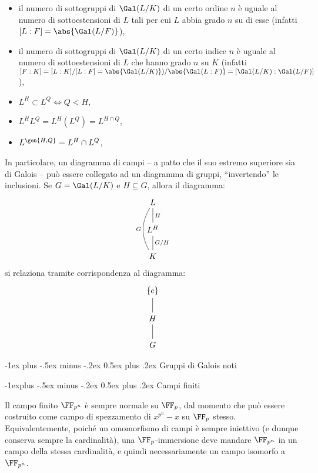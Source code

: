 \documentclass[10pt,landscape]{article}
\makeatletter
\renewcommand{\section}{\@startsection{section}{1}{0mm}%
	{-1ex plus -.5ex minus -.2ex}%
	{0.5ex plus .2ex}%
	{\normalfont\large\bfseries}}
\renewcommand{\subsection}{\@startsection{subsection}{2}{0mm}%
	{-1explus -.5ex minus -.2ex}%
	{0.5ex plus .2ex}%
	{\normalfont\normalsize\bfseries}}
\makeatother
\begin{document}
\begin{multicols}{3}
		\begin{itemize}
			\item il numero di sottogruppi di $\Gal(L / K)$ di un certo ordine $n$ è uguale al numero di sottoestensioni di $L$ tali per cui $L$ abbia
			grado $n$ su di esse (infatti $[L : F] = \abs{\Gal(L / F)}$),
			\item il numero di sottogruppi di $\Gal(L / K)$ di
			un certo indice $n$ è uguale al numero di
			sottoestensioni di $L$ che hanno grado $n$ su
			$K$ (infatti $[F : K] = [L : K] / [L : F] = \abs{\Gal(L / K)}) / \abs{\Gal(L : F)} =
			[\Gal(L / K) : \Gal(L / F)]$),
			\item $L^H \subset L^Q \iff Q < H$,
			\item $L^H L^Q = L^H(L^Q) = L^{H \cap Q}$,
			\item $L^{\gen{H, Q}} = L^H \cap L^Q$,
		\end{itemize}
	
		In particolare, un diagramma di campi -- a patto
		che il suo estremo superiore sia di Galois -- può
		essere collegato ad un diagramma di gruppi,
		``invertendo'' le inclusioni. Se
		$G = \Gal(L / K)$ e $H \subseteq G$, allora il
		diagramma:
		    \[\begin{tikzcd}
				L \\
				{L^H} \\
				K
				\arrow["G", bend left, no head, from=3-1, to=1-1]
				\arrow["{G/H}"', no head, from=3-1, to=2-1]
				\arrow["H"', no head, from=2-1, to=1-1]
			\end{tikzcd}\]
		si relaziona tramite corrispondenza al
		diagramma:
		\[\begin{tikzcd}[row sep=small]
			{\{e\}} \\
			\\
			H \\
			\\
			G
			\arrow[no head, from=1-1, to=3-1]
			\arrow[no head, from=3-1, to=5-1]
		\end{tikzcd}\]
		
		\section{Gruppi di Galois noti}

		\subsection{Campi finiti}
		
		Il campo finito $\FF_{p^n}$ è sempre normale
		su $\FF_p$, dal momento che può essere costruito
		come campo di spezzamento di $x^{p^n} - x$ su
		$\FF_p$ stesso. Equivalentemente, poiché
		un omomorfismo di campi è sempre iniettivo (e dunque
		conserva sempre la cardinalità),
		una $\FF_p$-immersione deve mandare $\FF_{p^n}$
		in un campo della stessa cardinalità, e quindi
		necessariamente un campo isomorfo a $\FF_{p^n}$. \medskip
		

\end{multicols}
\end{document}

